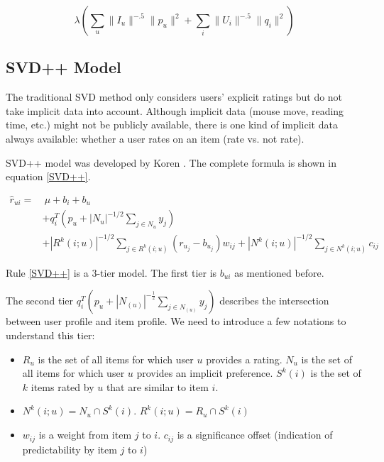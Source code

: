 \documentclass[letter paper, 11pt]{article}
\begin{document}
	\begin{equation}
		\label{eqn:modified-weighted-lambda}
		\lambda (\sum_u \|I_u\|^{-.5} \|p_u\|^2 + \sum_i \|U_i\|^{-.5} \|q_i\|^2)
	\end{equation}

	\subsection{SVD++ Model}
	
	The traditional SVD method only considers users' explicit ratings but do not take implicit data into account. Although implicit data (mouse move, reading time, etc.) might not be publicly available, there is one kind of implicit data always available: whether a user rates on an item (rate vs. not rate). 
	
	
	SVD++ model was developed by Koren \cite{korenFactorization}. The complete formula is shown in equation \ref{SVD++}. 
	
	\begin{equation} \label{SVD++}
		\tag*{SVD++ Model in Three-Tier}
		\begin{split}
			\hat{r}_{ui} =& \ \mu + b_i + b_u \\ 
			& + q_i^T  (p_u + |N_u|^{-1/2} \sum_{j \in N_u}y_j) \\ 
			& + |R^k(i; u)|^{-1/2} \sum_{j \in R^k(i; u)} (r_{u_j} - b_{u_j}) w_{ij} + |N^k(i; u)|^{-1/2} \sum_{j \in N^k(i; u)} c_{ij}
		\end{split}
	\end{equation}
	
	
	Rule \ref{SVD++} is a 3-tier model. The first tier is $b_{ui}$ as mentioned before. 
	
	
	The second tier $q_i^T  (p_u + |N_{(u)}|^{-\frac{1}{2}} \sum_{j \in N_{(u)}}y_j)$ describes the intersection between user profile and item profile. We need to introduce a few notations to understand this tier:
	\begin{itemize}
		\item $R_u$ is the set of all items for which user $u$ provides a rating. $N_u$ is the set of all items for which user $u$ provides an implicit preference. $S^k(i)$ is the set of $k$ items rated by $u$ that are similar to item $i$.
		
		\item $N^k{(i; u)} = N_u \cap S^k (i)$. $R^k{(i; u)} = R_u \cap S^k (i)$
		
		\item $w_{ij}$ is a weight from item $j$ to $i$. $c_{ij}$ is a significance offset (indication of predictability by item $j$ to $i$)
	\end{itemize}
	
\end{document}
